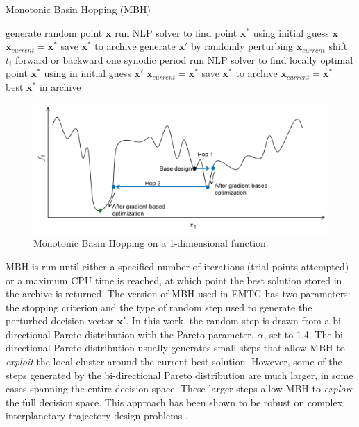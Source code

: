 \begin{algorithm}
	\caption{Monotonic Basin Hopping (\acs{MBH})\label{alg:MBH}}
	\begin{algorithmic}
		\State generate random point $\mathbf{x}$
		\State run NLP solver to find point $\mathbf{x}^*$ using initial guess $\mathbf{x}$
		\State $\mathbf{x}_{current} = \mathbf{x}^*$
		\State save $\mathbf{x}^*$ to archive
		\EndIf
		\State generate $\mathbf{x}'$ by randomly perturbing $\mathbf{x}_{current}$
		\State shift $t_i$ forward or backward one synodic period
		\EndIf
		\EndFor
		\State run NLP solver to find locally optimal point $\mathbf{x}^*$ using in initial guess $\mathbf{x}'$
		\State $\mathbf{x}_{current} = \mathbf{x}^*$
		\State save $\mathbf{x}^*$ to archive
		\State $\mathbf{x}_{current} = \mathbf{x}^*$
		\EndIf
		\EndWhile	\\			
		\Return best $\mathbf{x}^*$ in archive
	\end{algorithmic}
\end{algorithm}

\begin{figure}
	\centering
	\includegraphics[width=0.8\linewidth]{./inner_loop/MBH.png}
	\caption{ Monotonic Basin Hopping on a 1-dimensional function.}
	\label{fig:MBH}
\end{figure}

\ac{MBH} is run until either a specified number of iterations (trial points attempted) or a maximum CPU time is reached, at which point the best solution stored in the archive is returned. The version of \ac{MBH} used in EMTG has two parameters: the stopping criterion and the type of random step used to generate the perturbed decision vector $\mathbf{x}'$. In this work, the random step is drawn from a bi-directional Pareto distribution with the Pareto parameter, $\alpha$, set to 1.4. The bi-directional Pareto distribution usually generates small steps that allow \ac{MBH} to \textit{exploit} the local cluster around the current best solution. However, some of the steps generated by the bi-directional Pareto distribution are much larger, in some cases spanning the entire decision space. These larger steps allow \ac{MBH} to \textit{explore} the full decision space. This approach has been shown to be robust on complex interplanetary trajectory design problems \cite{MBH_ISSFD_2014}.

